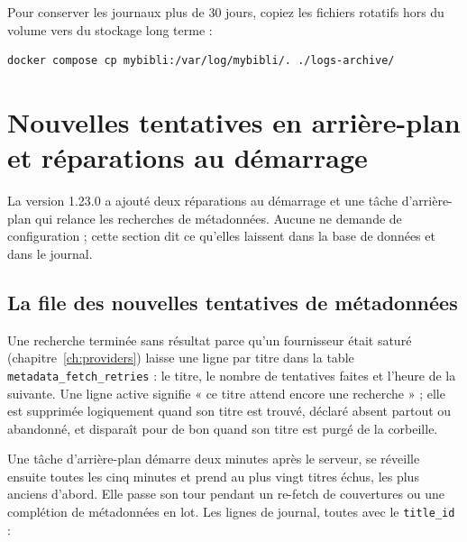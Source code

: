 Pour conserver les journaux plus de 30 jours, copiez les fichiers
rotatifs hors du volume vers du stockage long terme :

\begin{lstlisting}
docker compose cp mybibli:/var/log/mybibli/. ./logs-archive/
\end{lstlisting}

\section{Nouvelles tentatives en arrière-plan et réparations au démarrage}
\label{sec:startup-repairs}

La version 1.23.0 a ajouté deux réparations au démarrage et une tâche
d'arrière-plan qui relance les recherches de métadonnées. Aucune ne
demande de configuration ; cette section dit ce qu'elles laissent dans
la base de données et dans le journal.

\subsection*{La file des nouvelles tentatives de métadonnées}

Une recherche terminée sans résultat parce qu'un fournisseur était
saturé (chapitre~\ref{ch:providers}) laisse une ligne par titre dans la
table \texttt{metadata\_fetch\_retries} :
le titre, le nombre de tentatives faites et l'heure de la suivante. Une
ligne active signifie « ce titre attend encore une recherche » ; elle
est supprimée logiquement quand son titre est trouvé, déclaré absent
partout ou abandonné, et disparaît pour de bon quand son titre est
purgé de la corbeille.

Une tâche d'arrière-plan démarre deux minutes après le serveur, se
réveille ensuite toutes les cinq minutes et prend au plus vingt titres
échus, les plus anciens d'abord. Elle passe son tour pendant un
re-fetch de couvertures ou une complétion de métadonnées en lot. Les
lignes de journal, toutes avec le \texttt{title\_id} :


